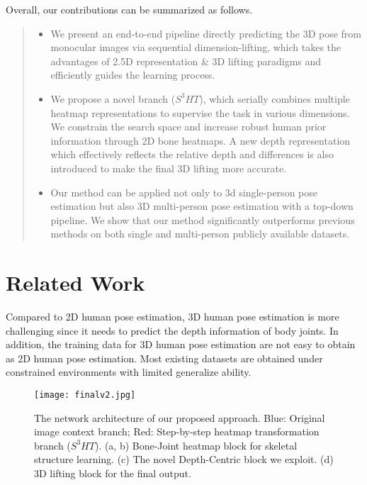 \documentclass[letterpaper]{article} \usepackage{aaai21}  \usepackage{times}  \usepackage{helvet} \usepackage{courier}  \usepackage[hyphens]{url}  \usepackage{graphicx} \urlstyle{rm} \def\UrlFont{\rm}  \usepackage{natbib}  \usepackage{caption} \frenchspacing  \setlength{\pdfpagewidth}{8.5in}  \setlength{\pdfpageheight}{11in}
\begin{document}
Overall, our contributions can be summarized as follows.

\begin{quote}
\begin{itemize}
\item We present an end-to-end pipeline directly predicting the 3D pose from monocular images via sequential dimension-lifting, which takes the advantages of 2.5D representation \& 3D lifting paradigms and efficiently guides the learning process. 

\item We propose a novel branch ($S^3HT$), which serially combines multiple heatmap representations to supervise the task in various dimensions. We constrain the search space and increase robust human prior information through 2D bone heatmaps. A new depth representation which effectively reflects the relative depth and differences is also introduced to make the final 3D lifting more accurate.

\item Our method can be applied not only to 3d single-person pose estimation but also 3D multi-person pose estimation with a top-down pipeline. We show that our method significantly outperforms previous methods on both single and multi-person publicly available datasets. 

\end{itemize}
\end{quote}

\section{Related Work}

Compared to 2D human pose estimation, 3D human pose estimation is more challenging since it needs to predict the depth information of body joints. In addition, the training data for 3D human pose estimation are not easy to obtain as 2D human pose estimation. Most existing datasets are obtained under constrained environments with limited generalize ability. 

\begin{figure*}[htbp]
\centering
\texttt{[image: finalv2.jpg]}
\caption{The network architecture of our proposed approach. Blue: Original image context branch; Red: Step-by-step heatmap transformation branch ($S^3HT$). (a, b) Bone-Joint heatmap block for skeletal structure learning. (c) The novel Depth-Centric block we exploit. (d) 3D lifting block for the final output.}
\label{fig2}
\end{figure*}
\end{document}
